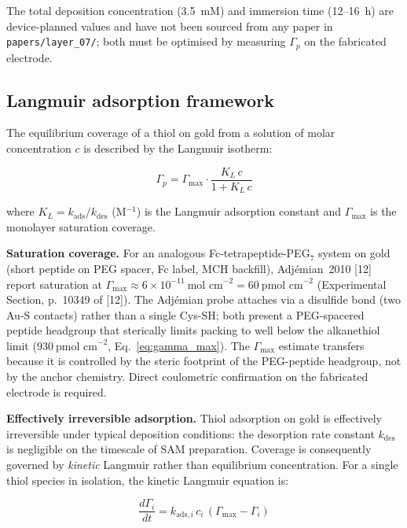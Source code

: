 \documentclass[10pt,a4paper]{article}
\numberwithin{equation}{section}
\newcommand{\cit}[1]{[#1]}   %
\begin{document}
The total deposition concentration (3.5~mM) and immersion time (12--16~h) are
device-planned values and have not been sourced from any paper in
\texttt{papers/layer\_07/}; both must be optimised by measuring $\Gamma_p$ on the
fabricated electrode.

\subsection{Langmuir adsorption framework}
\label{sec:langmuir}

The equilibrium coverage of a thiol on gold from a solution of molar concentration $c$
is described by the Langmuir isotherm:

\begin{equation}
  \Gamma_p = \Gamma_{\max} \cdot \frac{K_L\,c}{1 + K_L\,c}
  \label{eq:langmuir}
\end{equation}

where $K_L = k_{\text{ads}}/k_{\text{des}}$ (M$^{-1}$) is the Langmuir adsorption
constant and $\Gamma_{\max}$ is the monolayer saturation coverage.

\textbf{Saturation coverage.} For an analogous Fc-tetrapeptide-PEG$_7$ system on gold
(short peptide on PEG spacer, Fc label, MCH backfill), Adj\'{e}mian~2010 \cit{12}
report saturation at $\Gamma_{\max} \approx 6 \times 10^{-11}\ \text{mol~cm}^{-2}
= 60\ \text{pmol~cm}^{-2}$ (Experimental Section, p.~10349 of \cit{12}). The
Adj\'{e}mian probe attaches via a disulfide bond (two Au-S contacts) rather than a
single Cys-SH; both present a PEG-spacered peptide headgroup that sterically limits
packing to well below the alkanethiol limit ($930\ \text{pmol~cm}^{-2}$,
Eq.~\eqref{eq:gamma_max}). The $\Gamma_{\max}$ estimate transfers because it is
controlled by the steric footprint of the PEG-peptide headgroup, not by the
anchor chemistry. Direct coulometric confirmation on the fabricated electrode is
required.

\textbf{Effectively irreversible adsorption.} Thiol adsorption on gold is effectively
irreversible under typical deposition conditions: the desorption rate constant
$k_{\text{des}}$ is negligible on the timescale of SAM preparation. Coverage is
consequently governed by \emph{kinetic} Langmuir rather than equilibrium concentration.
For a single thiol species in isolation, the kinetic Langmuir equation is:

\begin{equation}
  \frac{d\Gamma_i}{dt} = k_{\text{ads},i}\,c_i\,(\Gamma_{\max} - \Gamma_i)
  \label{eq:langmuir_kin}
\end{equation}
\end{document}
